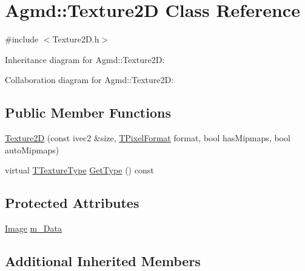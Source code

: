 \hypertarget{class_agmd_1_1_texture2_d}{\section{Agmd\+:\+:Texture2\+D Class Reference}
\label{class_agmd_1_1_texture2_d}
}


{\ttfamily \#include $<$Texture2\+D.\+h$>$}



Inheritance diagram for Agmd\+:\+:Texture2\+D\+:


Collaboration diagram for Agmd\+:\+:Texture2\+D\+:
\subsection*{Public Member Functions}
\begin{DoxyCompactItemize}
\item 
\hyperlink{class_agmd_1_1_texture2_d_ab8d5908a6e1036311ae21c81e2cefa06}{Texture2\+D} (const ivec2 \&size, \hyperlink{namespace_agmd_afc48fd9fa5dccb4c5621c052bfd1a7ec}{T\+Pixel\+Format} format, bool has\+Mipmaps, bool auto\+Mipmaps)
\item 
virtual \hyperlink{namespace_agmd_a7036bece09449a930cfec410f75e85f4}{T\+Texture\+Type} \hyperlink{class_agmd_1_1_texture2_d_a0e99997ddede5a08b62f4a721331805e}{Get\+Type} () const 
\end{DoxyCompactItemize}
\subsection*{Protected Attributes}
\begin{DoxyCompactItemize}
\item 
\hyperlink{class_agmd_1_1_image}{Image} \hyperlink{class_agmd_1_1_texture2_d_a364f4407132d02473df2398198614646}{m\+\_\+\+Data}
\end{DoxyCompactItemize}
\subsection*{Additional Inherited Members}


